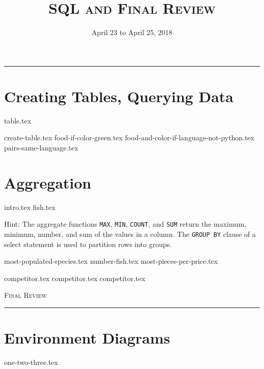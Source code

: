 \documentclass{exam}
\title{\textsc{SQL and Final Review}}
\date{April 23 to April 25, 2018}
\begin{document}
\maketitle
\rule{\textwidth}{0.15em}
\fontsize{12}{15}\selectfont

\section{Creating Tables, Querying Data}
{table.tex}
\begin{questions}
{create-table.tex}
\newpage
{food-if-color-green.tex}
{food-and-color-if-language-not-python.tex}
{pairs-same-language.tex}
\end{questions}

\newpage
\section{Aggregation}
{intro.tex}
{fish.tex}

Hint: The aggregate functions \texttt{MAX}, \texttt{MIN}, \texttt{COUNT}, and \texttt{SUM} return the maximum, minimum, number, and sum of the values in a column. The  \texttt{GROUP BY} clause of a select statement is used to partition rows into groups.

\begin{questions}
{most-populated-species.tex}
{number-fish.tex}
{most-pieces-per-price.tex}

\newpage
{competitor.tex}
{competitor.tex}
{competitor.tex}
\end{questions}

\newpage
{\huge \vspace*{0.5cm} \textsc{Final Review}}

\rule{\textwidth}{0.15em}

\section{Environment Diagrams}
\begin{questions}
{one-two-three.tex}
\end{questions}
\end{document}
